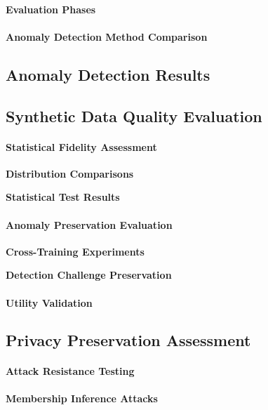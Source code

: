 \documentclass[runningheads]{llncs}
\begin{document}
\paragraph{Evaluation Phases}

\paragraph{Anomaly Detection Method Comparison}

\subsection{Anomaly Detection Results}
\label{sec:results}

\subsection{Synthetic Data Quality Evaluation}
\label{sec:synthetic-eval}

\paragraph{Statistical Fidelity Assessment}

\textbf{Distribution Comparisons}

\textbf{Statistical Test Results}

\paragraph{Anomaly Preservation Evaluation}

\textbf{Cross-Training Experiments}

\textbf{Detection Challenge Preservation}

\paragraph{Utility Validation}

\subsection{Privacy Preservation Assessment}
\label{sec:privacy-eval}

\paragraph{Attack Resistance Testing}

\textbf{Membership Inference Attacks}
\end{document}
